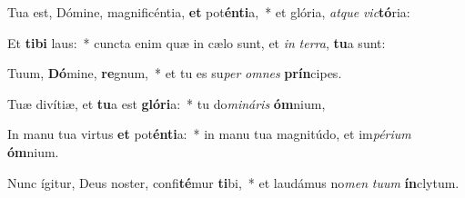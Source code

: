 \item Tua est, Dómine, magnificéntia, \textbf{et} pot\textbf{én}\textbf{ti}a,~* et glória, \textit{at}\textit{que} \textit{vic}\textbf{tó}ria:
\item Et \textbf{ti}\textbf{bi} laus:~* cuncta enim quæ in cælo sunt, et \textit{in} \textit{ter}\textit{ra}, \textbf{tu}a sunt:
\item Tuum, \textbf{Dó}mine, \textbf{re}gnum,~* et tu es su\textit{per} \textit{om}\textit{nes} \textbf{prín}cipes.
\item Tuæ divítiæ, et \textbf{tu}a est \textbf{gló}\textbf{ri}a:~* tu do\textit{mi}\textit{ná}\textit{ris} \textbf{óm}nium,
\item In manu tua virtus \textbf{et} pot\textbf{én}\textbf{ti}a:~* in manu tua magnitúdo, et im\textit{pé}\textit{ri}\textit{um} \textbf{óm}nium.
\item Nunc ígitur, Deus noster, confi\textbf{té}mur \textbf{ti}bi,~* et laudámus no\textit{men} \textit{tu}\textit{um} \textbf{ín}clytum.
